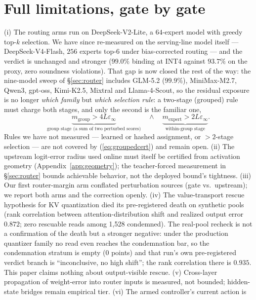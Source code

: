 \documentclass[11pt]{article}
\renewcommand{\_}{\WCorigunderscore\allowbreak}
\begin{document}
\section{Full limitations, gate by gate}
\label{app:limits}
(i) The routing arms run on DeepSeek-V2-Lite, a $64$-expert model with
greedy top-$k$ selection. We have since re-measured on the serving-line
model itself --- DeepSeek-V4-Flash, $256$ experts top-$6$ under
bias-corrected routing --- and the verdict is unchanged and stronger
($99.0\%$ binding at INT4 against $93.7\%$ on the proxy, zero soundness
violations). That gap is now closed the rest of the way: the
nine-model sweep of \S\ref{sec:router} includes GLM-5.2 ($99.9\%$),
MiniMax-M2.7, Qwen3, gpt-oss, Kimi-K2.5, Mixtral and Llama-4-Scout, so
the residual exposure is no longer \emph{which family} but \emph{which
selection rule}: a two-stage (grouped) rule must charge both stages, and
only the second is the familiar one,
\begin{equation}
\underbrace{m_{\mathrm{group}}>4L\varepsilon_\infty}_{\text{group stage
(a sum of two perturbed scores)}}
\quad\wedge\quad
\underbrace{m_{\mathrm{expert}}>2L\varepsilon_\infty}_{\text{within-group
stage}} .
\label{eq:groupedcert}
\end{equation}
Rules we have not measured --- learned or hashed assignment, or
$>2$-stage selection --- are not covered by
(\ref{eq:groupedcert}) and remain open. (ii) The upstream logit-error radius used online must itself be
certified from activation geometry (Appendix~\ref{app:geometry}); the
teacher-forced measurement in \S\ref{sec:router} bounds achievable
behavior, not the deployed bound's tightness. (iii) Our first
router-margin arm conflated perturbation sources (gate vs.\ upstream);
we report both arms and the correction openly. (iv) The value-transport
rescue hypothesis for KV quantization died its pre-registered death on
synthetic pools (rank correlation between attention-distribution
shift and realized output error $0.872$; zero rescuable reads among
1,528 condemned). The real-pool recheck is not a confirmation of the
death but a stronger negative: under the production quantizer family no
read even reaches the condemnation bar, so the condemnation stratum is
empty ($0$ points) and that run's own pre-registered
verdict branch is ``inconclusive, no high shift''; the rank correlation there is
$0.935$. This paper claims nothing about
output-visible rescue. (v) Cross-layer propagation of weight-error
into router inputs is measured, not bounded; hidden-state bridges
remain empirical tier. (vi) The armed controller's current action is
\end{document}
